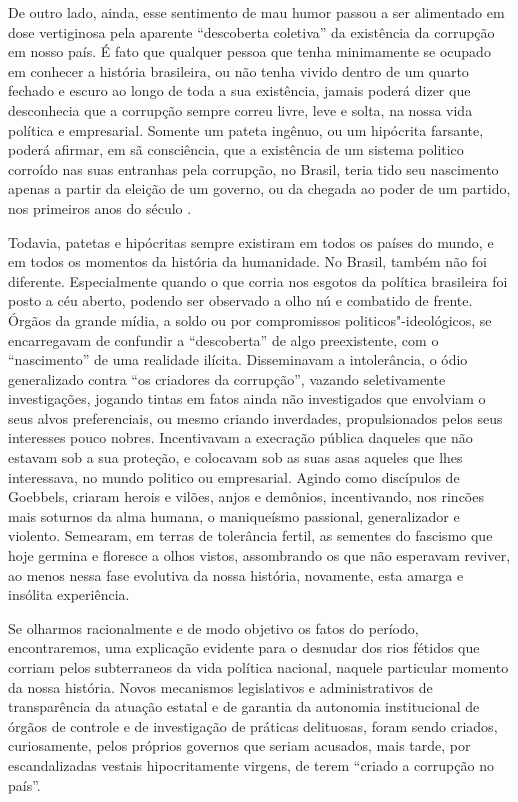 De outro lado, ainda, esse sentimento de mau humor passou a ser
alimentado em dose vertiginosa pela aparente ``descoberta coletiva'' da
existência da corrupção em nosso país. É fato que qualquer pessoa que
tenha minimamente se ocupado em conhecer a história brasileira, ou não
tenha vivido dentro de um quarto fechado e escuro ao longo de toda a sua
existência, jamais poderá dizer que desconhecia que a corrupção sempre
correu livre, leve e solta, na nossa vida política e empresarial.
Somente um pateta ingênuo, ou um hipócrita farsante, poderá afirmar, em
sã consciência, que a existência de um sistema politico corroído nas
suas entranhas pela corrupção, no Brasil, teria tido seu nascimento
apenas a partir da eleição de um governo, ou da chegada ao poder de um
partido, nos primeiros anos do século .

Todavia, patetas e hipócritas sempre existiram em todos os países do
mundo, e em todos os momentos da história da humanidade. No Brasil,
também não foi diferente. Especialmente quando o que corria nos esgotos
da política brasileira foi posto a céu aberto, podendo ser observado a
olho nú e combatido de frente. Órgãos da grande mídia, a soldo ou por
compromissos politicos"-ideológicos, se encarregavam de confundir a
``descoberta'' de algo preexistente, com o ``nascimento'' de uma
realidade ilícita. Disseminavam a intolerância, o ódio generalizado
contra ``os criadores da corrupção'', vazando seletivamente
investigações, jogando tintas em fatos ainda não investigados que
envolviam o seus alvos preferenciais, ou mesmo criando inverdades,
propulsionados pelos seus interesses pouco nobres. Incentivavam a
execração pública daqueles que não estavam sob a sua proteção, e
colocavam sob as suas asas aqueles que lhes interessava, no mundo
politico ou empresarial. Agindo como discípulos de Goebbels, criaram
herois e vilões, anjos e demônios, incentivando, nos rincões mais
soturnos da alma humana, o maniqueísmo passional, generalizador e
violento. Semearam, em terras de tolerância fertil, as sementes do
fascismo que hoje germina e floresce a olhos vistos, assombrando os que
não esperavam reviver, ao menos nessa fase evolutiva da nossa história,
novamente, esta amarga e insólita experiência.

Se olharmos racionalmente e de modo objetivo os fatos do período,
encontraremos, uma explicação evidente para o desnudar dos rios fétidos
que corriam pelos subterraneos da vida política nacional, naquele
particular momento da nossa história. Novos mecanismos legislativos e
administrativos de transparência da atuação estatal e de garantia da
autonomia institucional de órgãos de controle e de investigação de
práticas delituosas, foram sendo criados, curiosamente, pelos próprios
governos que seriam acusados, mais tarde, por escandalizadas vestais
hipocritamente virgens, de terem ``criado a corrupção no país''.

